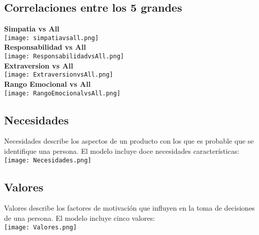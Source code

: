 \documentclass[10pt]{article}
\begin{document}
                
                
                
                
    \subsection{Correlaciones entre los 5 grandes}
            \textbf{Simpatia vs All} \\
            \texttt{[image: simpatiavsall.png]}\\
            \textbf{Responsabilidad vs All} \\
            \texttt{[image: ResponsabilidadvsAll.png]}\\
            \textbf{Extraversion vs All} \\
            \texttt{[image: ExtraversionvsAll.png]}\\
            \textbf{Rango Emocional vs All} \\
            \texttt{[image: RangoEmocionalvsAll.png]}\\
                        
                
                
                
                
                
                
        
        
    \subsection{Necesidades}
         Necesidades describe los aspectos de un producto con los que es probable que se identifique una persona. El modelo incluye doce necesidades características: \\
         \texttt{[image: Necesidades.png]}
         
         
    
    \subsection{Valores}
          Valores describe los factores de motivación que influyen en la toma de decisiones de una persona. El modelo incluye cinco valores: \\
          \texttt{[image: Valores.png]}
          
          
          
          
          
          
        
\end{document}
